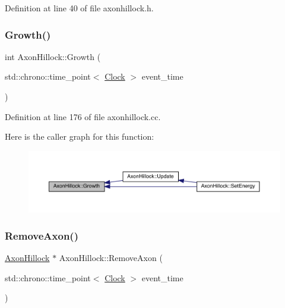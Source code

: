 Definition at line 40 of file axonhillock.\+h.

\mbox{\label{class_axon_hillock_a5c5cd9008f1410898980528b959d668e}} 
\subsubsection{\texorpdfstring{Growth()}{Growth()}}
{\footnotesize\ttfamily int Axon\+Hillock\+::\+Growth (\begin{DoxyParamCaption}\item[{std\+::chrono\+::time\+\_\+point$<$ \hyperlink{universe_8h_a0ef8d951d1ca5ab3cfaf7ab4c7a6fd80}{Clock} $>$}]{event\+\_\+time }\end{DoxyParamCaption})}



Definition at line 176 of file axonhillock.\+cc.

Here is the caller graph for this function\+:\nopagebreak
\begin{figure}[H]
\begin{center}
\leavevmode
\includegraphics[width=350pt]{class_axon_hillock_a5c5cd9008f1410898980528b959d668e_icgraph}
\end{center}
\end{figure}
\mbox{\label{class_axon_hillock_ae7c379ef3a70c8a43a0f105ccc94b54b}} 
\subsubsection{\texorpdfstring{Remove\+Axon()}{RemoveAxon()}}
{\footnotesize\ttfamily \hyperlink{class_axon_hillock}{Axon\+Hillock} $\ast$ Axon\+Hillock\+::\+Remove\+Axon (\begin{DoxyParamCaption}\item[{std\+::chrono\+::time\+\_\+point$<$ \hyperlink{universe_8h_a0ef8d951d1ca5ab3cfaf7ab4c7a6fd80}{Clock} $>$}]{event\+\_\+time }\end{DoxyParamCaption})}



